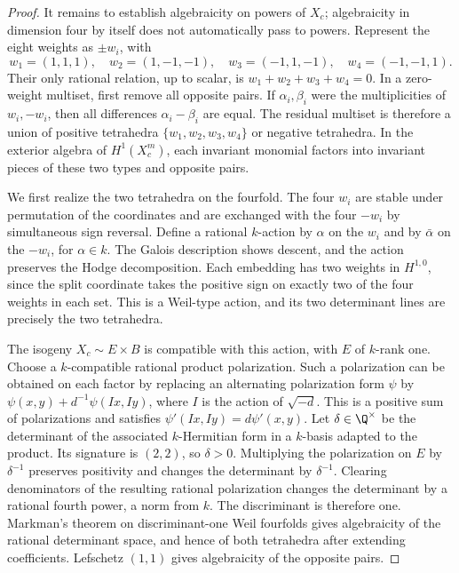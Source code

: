 \begin{proof}
It remains to establish algebraicity on powers of \(X_c\); algebraicity in dimension four by itself does not automatically pass to powers. Represent the eight weights as \(\pm w_i\), with
\[
 w_1=(1,1,1),\quad w_2=(1,-1,-1),\quad
 w_3=(-1,1,-1),\quad w_4=(-1,-1,1).
\]
Their only rational relation, up to scalar, is \(w_1+w_2+w_3+w_4=0\). In a zero-weight multiset, first remove all opposite pairs. If \(\alpha_i,\beta_i\) were the multiplicities of \(w_i,-w_i\), then all differences \(\alpha_i-\beta_i\) are equal. The residual multiset is therefore a union of positive tetrahedra \(\{w_1,w_2,w_3,w_4\}\) or negative tetrahedra. In the exterior algebra of \(H^1(X_c^m)\), each invariant monomial factors into invariant pieces of these two types and opposite pairs.

We first realize the two tetrahedra on the fourfold. The four \(w_i\) are stable under permutation of the coordinates and are exchanged with the four \(-w_i\) by simultaneous sign reversal. Define a rational \(k\)-action by \(\alpha\) on the \(w_i\) and by \(\bar\alpha\) on the \(-w_i\), for \(\alpha\in k\). The Galois description shows descent, and the action preserves the Hodge decomposition. Each embedding has two weights in \(H^{1,0}\), since the split coordinate takes the positive sign on exactly two of the four weights in each set. This is a Weil-type action, and its two determinant lines are precisely the two tetrahedra.

The isogeny \(X_c\sim E\times B\) is compatible with this action, with \(E\) of \(k\)-rank one. Choose a \(k\)-compatible rational product polarization. Such a polarization can be obtained on each factor by replacing an alternating polarization form \(\psi\) by
\(\psi(x,y)+d^{-1}\psi(Ix,Iy)\), where \(I\) is the action of \(\sqrt{-d}\). This is a positive sum of polarizations and satisfies \(\psi'(Ix,Iy)=d\psi'(x,y)\). Let \(\delta\in\Q^\times\) be the determinant of the associated \(k\)-Hermitian form in a \(k\)-basis adapted to the product. Its signature is \((2,2)\), so \(\delta>0\). Multiplying the polarization on \(E\) by \(\delta^{-1}\) preserves positivity and changes the determinant by \(\delta^{-1}\). Clearing denominators of the resulting rational polarization changes the determinant by a rational fourth power, a norm from \(k\). The discriminant is therefore one. Markman's theorem on discriminant-one Weil fourfolds \cite[Theorem 1.5]{Mar23} gives algebraicity of the rational determinant space, and hence of both tetrahedra after extending coefficients. Lefschetz \((1,1)\) gives algebraicity of the opposite pairs.


\end{proof}

